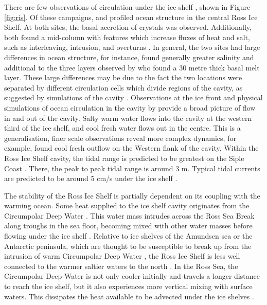 There are few observations of circulation under the ice shelf \citep[e.g.][]{jacobs1979circulation,stewart2018ice,stevens2020ocean,robinson2020ice}, shown in Figure \ref{fig:ris}.
Of these campaigns, \cite{jacobs1979circulation} and \cite{stevens2020ocean}  profiled ocean structure in the central Ross Ice Shelf. At both sites, the basal accretion of crystals was observed. Additionally, both found a mid-column with features which increase fluxes of heat and salt, such as interleaving, intrusion, and overturns  \citep{stevens2020ocean}. In general, the two sites had large differences in ocean structure, for instance, \cite{stevens2020ocean} found generally greater salinity and additional to the three layers observed by \cite{jacobs1979circulation} who found a 30 metre thick basal melt layer. These large differences may be due to the fact the two locations were separated by different circulation cells which divide regions of the cavity, as suggested by simulations of the cavity \citep{pritchard2012antarctic}.
Observations at the ice front \citep[e.g.][]{smethie2005circulation} and physical simulations of ocean circulation in the cavity by \cite{holland2003ice} provide a broad picture of flow in and out of the cavity. Salty warm water flows into the cavity at the western third of the ice shelf, and cool fresh water flows out in the centre. This is a generalisation, finer scale observations reveal more complex dynamics, for example, \cite{robinson2014evolution} found cool fresh outflow on the Western flank of the cavity. 
Within the Ross Ice Shelf cavity, the tidal range is predicted to be greatest on the Siple Coast \citep{padman2003tides}. There, the peak to peak tidal range is around 3 m. Typical tidal currents are predicted to be around 5 cm/s under the ice shelf \citep{padman2003tides}.

The stability of the Ross Ice Shelf is partially dependent on its coupling with the warming ocean. Some heat supplied to the ice shelf cavity originates from the Circumpolar Deep Water \cite[e.g.][]{rignot2002mass}. This water mass intrudes across the Ross Sea Break along troughs in the sea floor, becoming mixed with other water masses before flowing under the ice shelf \citep{castagno2017temporal}. Relative to ice shelves of the Amundsen sea or the Antarctic peninsula, which are thought to be susceptible to break up from the intrusion of warm Circumpolar Deep Water \citep{ favier2014retreat}, the Ross Ice Shelf is less well connected to the warmer saltier waters to the north \citep{dinniman2011model}. In the Ross Sea, the Circumpolar Deep Water is not only cooler initially and travels a longer distance to reach the ice shelf, but it also experiences more vertical mixing with surface waters. This dissipates the heat available to be advected under the ice shelves \citep{dinniman2011model}.

